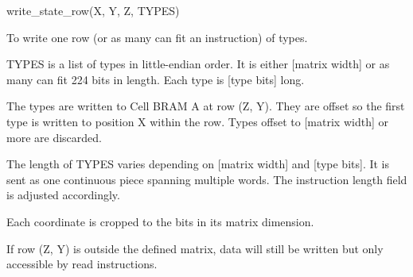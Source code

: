 

\format
write\_state\_row(X, Y, Z, TYPES)

\purpose

To write one row (or as many can fit an instruction) of types.

\description

TYPES is a list of types in little-endian order.
It is either [matrix width] or as many can fit 224 bits in length.
Each type is [type bits] long.

The types are written to Cell BRAM A at row (Z, Y).
They are offset so the first type is written to position X within the row.
Types offset to [matrix width] or more are discarded.

The length of TYPES varies depending on [matrix width] and [type bits].
It is sent as one continuous piece spanning multiple words.
The instruction length field is adjusted accordingly.

\notes

Each coordinate is cropped to the bits in its matrix dimension.

If row (Z, Y) is outside the defined matrix, data will still be written but only accessible by read instructions.
